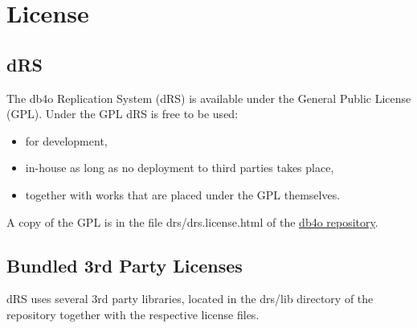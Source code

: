 
\chapter{License}
\label{drs:db4o-replication-system-drs-license}

\section*{dRS}

The db4o Replication System (dRS) is available under the General Public License (GPL). Under the GPL dRS is free to be used:

\begin{itemize}
\item for development,
\item in-house as long as no deployment to third parties takes place,
\item together with works that are placed under the GPL themselves.
\end{itemize}

A copy of the GPL is in the file drs/drs.license.html of the \href{https://github.com/blakemcbride/db4o}{db4o repository}.

\section*{Bundled 3rd Party Licenses}

dRS uses several 3rd party libraries, located in the drs/lib directory of the repository together with the respective license files.

